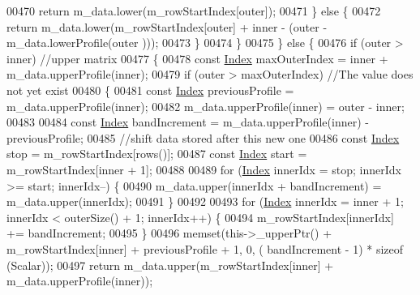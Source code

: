 \begin{DoxyCode}
00470                     \textcolor{keywordflow}{return} m\_data.lower(m\_rowStartIndex[outer]);
00471                 \} \textcolor{keywordflow}{else} \{
00472                     \textcolor{keywordflow}{return} m\_data.lower(m\_rowStartIndex[outer] + inner - (outer - m\_data.lowerProfile(outer
      )));
00473                 \}
00474             \}
00475         \} \textcolor{keywordflow}{else} \{
00476             \textcolor{keywordflow}{if} (outer > inner) \textcolor{comment}{//upper matrix}
00477             \{
00478                 \textcolor{keyword}{const} \hyperlink{group___core___module_a554f30542cc2316add4b1ea0a492ff02}{Index} maxOuterIndex = inner + m\_data.upperProfile(inner);
00479                 \textcolor{keywordflow}{if} (outer > maxOuterIndex) \textcolor{comment}{//The value does not yet exist}
00480                 \{
00481                     \textcolor{keyword}{const} \hyperlink{group___core___module_a554f30542cc2316add4b1ea0a492ff02}{Index} previousProfile = m\_data.upperProfile(inner);
00482                     m\_data.upperProfile(inner) = outer - inner;
00483 
00484                     \textcolor{keyword}{const} \hyperlink{group___core___module_a554f30542cc2316add4b1ea0a492ff02}{Index} bandIncrement = m\_data.upperProfile(inner) - previousProfile;
00485                     \textcolor{comment}{//shift data stored after this new one}
00486                     \textcolor{keyword}{const} \hyperlink{group___core___module_a554f30542cc2316add4b1ea0a492ff02}{Index} stop = m\_rowStartIndex[rows()];
00487                     \textcolor{keyword}{const} \hyperlink{group___core___module_a554f30542cc2316add4b1ea0a492ff02}{Index} start = m\_rowStartIndex[inner + 1];
00488 
00489                     \textcolor{keywordflow}{for} (\hyperlink{group___core___module_a554f30542cc2316add4b1ea0a492ff02}{Index} innerIdx = stop; innerIdx >= start; innerIdx--) \{
00490                         m\_data.upper(innerIdx + bandIncrement) = m\_data.upper(innerIdx);
00491                     \}
00492 
00493                     \textcolor{keywordflow}{for} (\hyperlink{group___core___module_a554f30542cc2316add4b1ea0a492ff02}{Index} innerIdx = inner + 1; innerIdx < outerSize() + 1; innerIdx++) \{
00494                         m\_rowStartIndex[innerIdx] += bandIncrement;
00495                     \}
00496                     memset(this->\_upperPtr() + m\_rowStartIndex[inner] + previousProfile + 1, 0, (
      bandIncrement - 1) * \textcolor{keyword}{sizeof} (Scalar));
00497                     \textcolor{keywordflow}{return} m\_data.upper(m\_rowStartIndex[inner] + m\_data.upperProfile(inner));

\end{DoxyCode}
